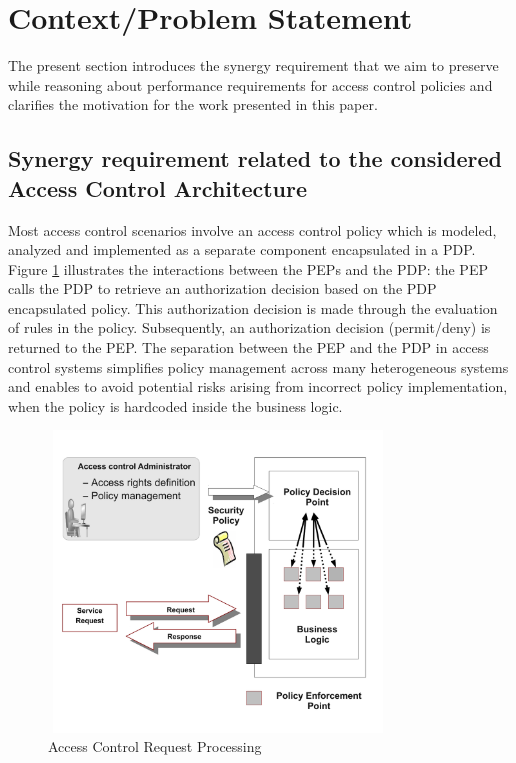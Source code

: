 



\section{Context/Problem Statement} \label{sec:context}
The present section introduces the synergy requirement that we aim to 
preserve while reasoning about performance requirements for access control policies and clarifies the motivation for the work presented in this paper.

\subsection{Synergy requirement related to the considered Access Control Architecture}
Most access control scenarios involve an access control policy which is modeled, analyzed and implemented as a separate component 
encapsulated in a PDP. Figure \ref{pep-pdp} illustrates the interactions between the PEPs and the PDP: the PEP calls the PDP to 
retrieve an authorization decision based on the PDP encapsulated policy. This authorization decision is made through the evaluation of rules in the policy. 
Subsequently, an authorization decision (permit/deny) is returned to the PEP.
The separation between the PEP and the PDP in access control systems simplifies policy management across many heterogeneous systems and enables to avoid
 potential risks arising from incorrect policy implementation, when the policy is hardcoded inside the business logic.

\begin{figure}[!h]
\begin{center}
\includegraphics[width=9cm, height=8cm]{business-logic}
\caption{Access Control Request Processing}
\label{pep-pdp}
\end{center}
\end{figure}

